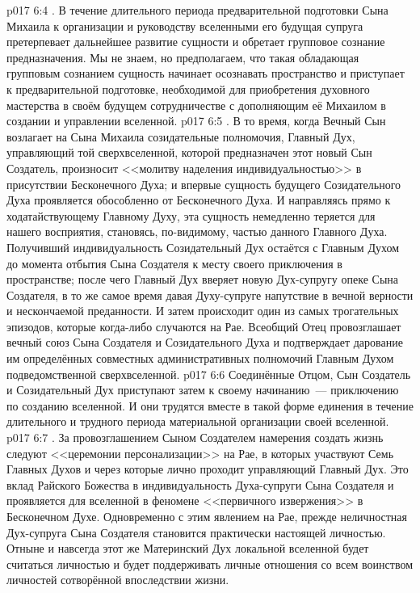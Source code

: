 \vs p017 6:4 . В течение длительного периода предварительной подготовки Сына Михаила к организации и руководству вселенными его будущая супруга претерпевает дальнейшее развитие сущности и обретает групповое сознание предназначения. Мы не знаем, но предполагаем, что такая обладающая групповым сознанием сущность начинает осознавать пространство и приступает к предварительной подготовке, необходимой для приобретения духовного мастерства в своём будущем сотрудничестве с дополняющим её Михаилом в создании и управлении вселенной.
\vs p017 6:5 . В то время, когда Вечный Сын возлагает на Сына Михаила созидательные полномочия, Главный Дух, управляющий той сверхвселенной, которой предназначен этот новый Сын Создатель, произносит <<молитву наделения индивидуальностью>> в присутствии Бесконечного Духа; и впервые сущность будущего Созидательного Духа проявляется обособленно от Бесконечного Духа. И направляясь прямо к ходатайствующему Главному Духу, эта сущность немедленно теряется для нашего восприятия, становясь, по\hyp{}видимому, частью данного Главного Духа. Получивший индивидуальность Созидательный Дух остаётся с Главным Духом до момента отбытия Сына Создателя к месту своего приключения в пространстве; после чего Главный Дух вверяет новую Дух\hyp{}супругу опеке Сына Создателя, в то же самое время давая Духу\hyp{}супруге напутствие в вечной верности и нескончаемой преданности. И затем происходит один из самых трогательных эпизодов, которые когда\hyp{}либо случаются на Рае. Всеобщий Отец провозглашает вечный союз Сына Создателя и Созидательного Духа и подтверждает дарование им определённых совместных административных полномочий Главным Духом подведомственной сверхвселенной.
\vs p017 6:6 Соединённые Отцом, Сын Создатель и Созидательный Дух приступают затем к своему начинанию~--- приключению по созданию вселенной. И они трудятся вместе в такой форме единения в течение длительного и трудного периода материальной организации своей вселенной.
\vs p017 6:7 . За провозглашением Сыном Создателем намерения создать жизнь следуют <<церемонии персонализации>> на Рае, в которых участвуют Семь Главных Духов и через которые лично проходит управляющий Главный Дух. Это вклад Райского Божества в индивидуальность Духа\hyp{}супруги Сына Создателя и проявляется для вселенной в феномене <<первичного извержения>> в Бесконечном Духе. Одновременно с этим явлением на Рае, прежде неличностная Дух\hyp{}супруга Сына Создателя становится практически настоящей личностью. Отныне и навсегда этот же Материнский Дух локальной вселенной будет считаться личностью и будет поддерживать личные отношения со всем воинством личностей сотворённой впоследствии жизни.
